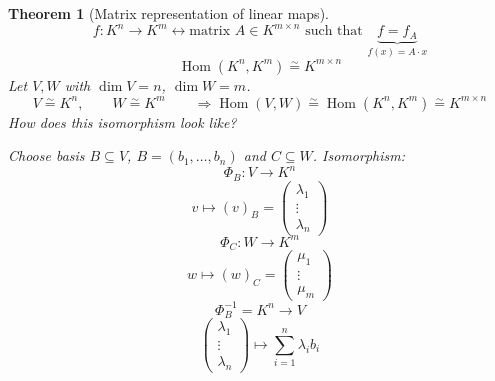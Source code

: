 \documentclass[a4paper,landscape,twocolumn]{article}
\newtheorem{theorem}{Theorem}
\DeclareMathOperator\Hom{Hom} %
\begin{document}
\begin{theorem}[Matrix representation of linear maps]
  \[ f: K^n \to K^m \leftrightarrow \text{matrix } A \in K^{m\times n} \text{ such that } \underbrace{f = f_A}_{f(x) = A \cdot x} \]
  \[ \Hom(K^n,K^m) \overset{\sim}{=} K^{m\times n} \]
  Let $V,W$ with $\dim{V} = n$, $\dim{W} = m$.
  \[
    V \overset{\sim}{=} K^n, \qquad
    W \overset{\sim}{=} K^m \qquad
    \Rightarrow \Hom(V, W) \overset{\sim}{=} \Hom(K^n,K^m) \overset{\sim}{=} K^{m\times n}
  \]
  How does this isomorphism look like?

  Choose basis $B \subseteq V$, $B = (b_1, \ldots, b_n)$ and $C \subseteq W$.
  Isomorphism:
  \[
    \Phi_B: V \to K^n
  \] \[
    v \mapsto (v)_B = \begin{pmatrix} \lambda_1 \\ \vdots \\ \lambda_n \end{pmatrix}
  \] \[
    \Phi_C: W \to K^m
  \] \[
    w \mapsto (w)_C = \begin{pmatrix} \mu_1 \\ \vdots \\ \mu_m \end{pmatrix}
  \] \[
    \Phi_B^{-1} = K^n \to V
  \] \[
    \begin{pmatrix} \lambda_1 \\ \vdots \\ \lambda_n \end{pmatrix}
      \mapsto
      \sum_{i=1}^n \lambda_i b_i
  \]


\end{theorem}
\end{document}
